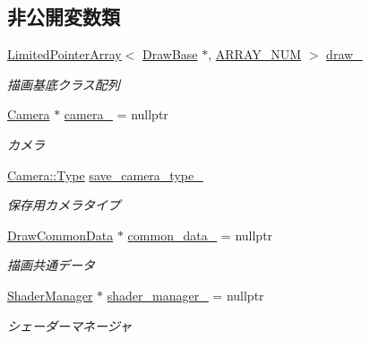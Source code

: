 \subsection*{非公開変数類}
\begin{DoxyCompactItemize}
\item 
\mbox{\hyperlink{class_limited_pointer_array}{Limited\+Pointer\+Array}}$<$ \mbox{\hyperlink{class_draw_base}{Draw\+Base}} $\ast$, \mbox{\hyperlink{class_render_target_shadow_map_a25b5fd61eef50d76b69314102ccc51fe}{A\+R\+R\+A\+Y\+\_\+\+N\+UM}} $>$ \mbox{\hyperlink{class_render_target_shadow_map_a8c16acb949d466197d47c4d57484eb7e}{draw\+\_\+}}
\begin{DoxyCompactList}\small\item\em 描画基底クラス配列 \end{DoxyCompactList}\item 
\mbox{\hyperlink{class_camera}{Camera}} $\ast$ \mbox{\hyperlink{class_render_target_shadow_map_ac5af1571a13426a6ebd49f96d9070223}{camera\+\_\+}} = nullptr
\begin{DoxyCompactList}\small\item\em カメラ \end{DoxyCompactList}\item 
\mbox{\hyperlink{class_camera_a3b0a1f58deca679ac665f61c480d1dcb}{Camera\+::\+Type}} \mbox{\hyperlink{class_render_target_shadow_map_a57f64742fbf9926ef3ab06eca311c9e7}{save\+\_\+camera\+\_\+type\+\_\+}}
\begin{DoxyCompactList}\small\item\em 保存用カメラタイプ \end{DoxyCompactList}\item 
\mbox{\hyperlink{class_draw_common_data}{Draw\+Common\+Data}} $\ast$ \mbox{\hyperlink{class_render_target_shadow_map_a95f2c6ef14bc3875893b229f9d8362bf}{common\+\_\+data\+\_\+}} = nullptr
\begin{DoxyCompactList}\small\item\em 描画共通データ \end{DoxyCompactList}\item 
\mbox{\hyperlink{class_shader_manager}{Shader\+Manager}} $\ast$ \mbox{\hyperlink{class_render_target_shadow_map_a05ee7ec6d95ec144cca0847bb880c9cb}{shader\+\_\+manager\+\_\+}} = nullptr
\begin{DoxyCompactList}\small\item\em シェーダーマネージャ \end{DoxyCompactList}\end{DoxyCompactItemize}


